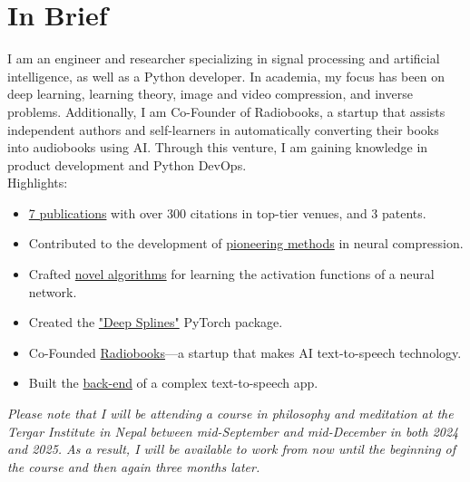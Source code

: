 \documentclass[a4paper,11pt]{article}
\begin{document}
  \vspace{16pt}

  \section{In Brief}
    I am an engineer and researcher specializing in signal processing and artificial intelligence, as well as a Python developer. In academia, my focus has been on deep learning, learning theory, image and video compression, and inverse problems. Additionally, I am Co-Founder of Radiobooks, a startup that assists independent authors and self-learners in automatically converting their books into audiobooks using AI. Through this venture, I am gaining knowledge in product development and Python DevOps.
    \\[10pt]
    Highlights:
    \\[-20pt]
    \begin{itemize}[leftmargin=*,noitemsep]
      \item \href{https://www.joaquimcampos.com/pubs.html}{7 publications} with over 300 citations in top-tier venues, and 3 patents.
      \item Contributed to the development of \href{https://www.joaquimcampos.com/compression.html}{pioneering methods} in neural compression.
      \item Crafted \href{https://www.joaquimcampos.com/deepsplines.html}{novel algorithms} for
      learning the activation functions of a neural network.
      \item Created the \href{https://pypi.org/project/deepsplines/}{"Deep Splines"} PyTorch package.
      \item Co-Founded \href{https://radiobooks.webflow.io/}{Radiobooks}—a startup that makes AI text-to-speech technology.
      \item Built the \href{https://github.com/joaquimcampos/radiobooks-sample}{back-end} of a complex text-to-speech app.
    \end{itemize}

    \vspace{4pt}

    \emph{Please note that I will be attending a course in philosophy and meditation at the Tergar Institute in Nepal between mid-September and mid-December in both 2024 and 2025. As a result, I will be available to work from now until the beginning of the course and then again three months later.}
\end{document}
